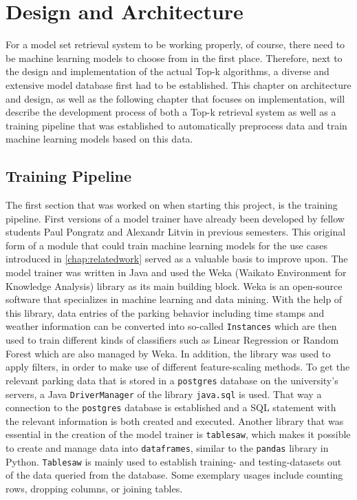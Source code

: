 \chapter{Design and Architecture} \label{chap:design}

For a model set retrieval system to be working properly, of course, there need to be machine learning models to choose from in the first place. Therefore, next to the design and implementation of the actual Top-k algorithms, a diverse and extensive model database first had to be established. This chapter on architecture and design, as well as the following chapter that focuses on implementation, will describe the development process of both a Top-k retrieval system as well as a training pipeline that was established to automatically preprocess data and train machine learning models based on this data.

\section{Training Pipeline}

The first section that was worked on when starting this project, is the training pipeline. First versions of a model trainer have already been developed by fellow students Paul Pongratz and Alexandr Litvin in previous semesters. This original form of a module that could train machine learning models for the use cases introduced in \autoref{chap:relatedwork} served as a valuable basis to improve upon. The model trainer was written in Java and used the Weka (Waikato Environment for Knowledge Analysis) \cite{eibe2016} library as its main building block. Weka is an open-source software that specializes in machine learning and data mining. With the help of this library, data entries of the parking behavior including time stamps and weather information can be converted into so-called \texttt{Instances} which are then used to train different kinds of classifiers such as Linear Regression or Random Forest which are also managed by Weka. In addition, the library was used to apply filters, in order to make use of different feature-scaling methods. To get the relevant parking data that is stored in a \texttt{postgres} database on the university's servers, a Java \texttt{DriverManager} of the library \texttt{java.sql} is used. That way a connection to the \texttt{postgres} database is established and a SQL statement with the relevant information is both created and executed. Another library that was essential in the creation of the model trainer is \texttt{tablesaw}, which makes it possible to create and manage data into \texttt{dataframes}, similar to the \texttt{pandas} library in Python. \texttt{Tablesaw} is mainly used to establish training- and testing-datasets out of the data queried from the database. Some exemplary usages include counting rows, dropping columns, or joining tables. 

